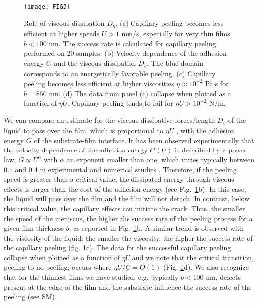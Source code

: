 \documentclass[10pt,twocolumn]{article}
\begin{document}
 \begin{figure}[ht!]
     \center
     \texttt{[image: FIG3]}%
     \caption{Role of viscous dissipation $D_{\eta}$. (a) Capillary peeling becomes less efficient at higher speeds $U > 1$ mm/s, especially for very thin films $b < 100$ nm. The success rate is calculated for capillary peeling performed on 20 samples. (b) Velocity dependence of the adhesion energy $G$ and the viscous dissipation $D_\eta$. The blue domain corresponds to an energetically favorable peeling. (c) Capillary peeling becomes less efficient at higher viscosities $\eta \approx 10^{-2}$ Pa$\cdot$s for $b= 850$ nm. (d) The data from panel (c) collapse when plotted as a function of $\eta U$.
     Capillary peeling tends to fail for $\eta U > 10^{-2}$ N/m.}
     \label{fig:results1}
 \end{figure}
We can compare an estimate for the viscous dissipative forces/length $D_\eta$ of the liquid to pass over the film, which is proportional to $\eta U$ \cite{Guyon2001}, with the adhesion energy $G$ of the substrate-film interface.
It has been observed experimentally that the velocity dependence of the adhesion energy $G(U)$ is described by a power law, $G\propto U^\alpha$ with $\alpha$ an exponent smaller than one, which varies typically between $0.1$ and $0.4$ in experimental and numerical studies \cite{Baljon482,deruelle1995adhesion,Kendall:1971}.
Therefore, if the peeling speed is greater than a critical value, the dissipated energy through viscous effects is larger than the cost of the adhesion energy (see Fig.~\ref{fig:results1}b).
In this case, the liquid will pass over the film and the film will not detach.
In contrast, below this critical value, the capillary effects can initiate the crack.
Thus, the smaller the speed of the meniscus, the higher the success rate of the peeling process for a given film thickness $b$, as reported in Fig.~\ref{fig:results1}b.
A similar trend is observed with the viscosity of the liquid:  the smaller the viscosity, the higher the success rate of the capillary peeling (fig. \ref{fig:results1}c).
The data for the successful capillary peeling collapse when plotted as a function of $\eta U$ and we note that the critical transition, peeling to no peeling, occurs where $\eta U / G = O(1)$ (Fig. \ref{fig:results1}d).
We also recognize that for the thinnest films we have studied, e.g.\ typically $b < 100$ nm, defects present at the edge of the film and the substrate influence the success rate of the peeling (see SM).
\end{document}
